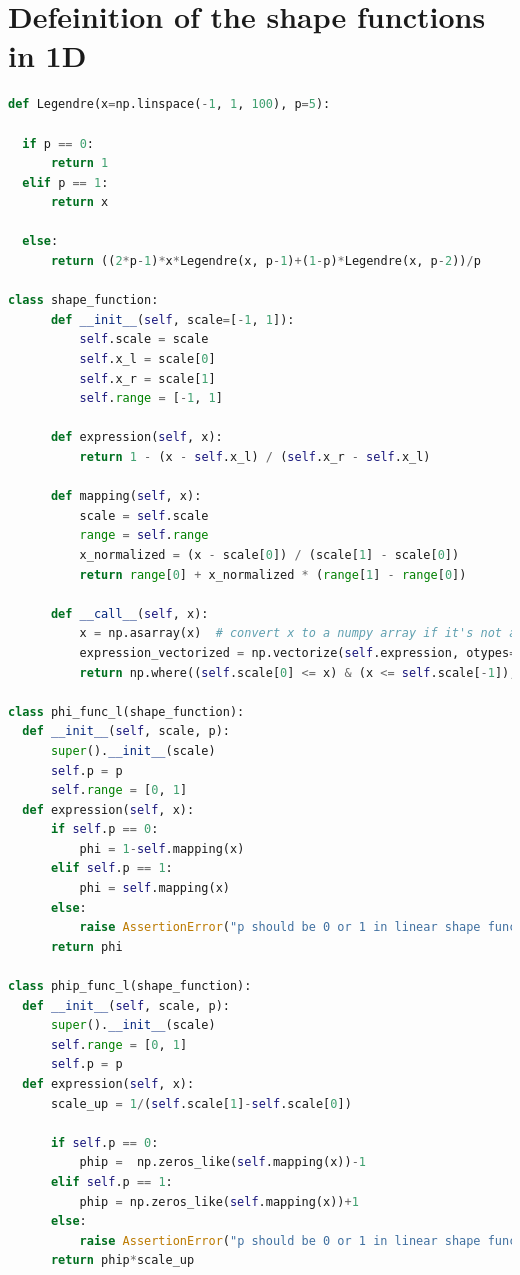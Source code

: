 \documentclass[twoside,twocolumn,10pt]{article}
\begin{document}
\section{Defeinition of the shape functions in 1D}
\label{Apdx:shape_1D}
\begin{lstlisting}[language=Python, caption=Defeinition of the shape functions in 1-D]
def Legendre(x=np.linspace(-1, 1, 100), p=5):

  if p == 0:
      return 1
  elif p == 1:
      return x

  else:
      return ((2*p-1)*x*Legendre(x, p-1)+(1-p)*Legendre(x, p-2))/p

class shape_function:
      def __init__(self, scale=[-1, 1]):
          self.scale = scale
          self.x_l = scale[0]
          self.x_r = scale[1]
          self.range = [-1, 1]
          
      def expression(self, x):
          return 1 - (x - self.x_l) / (self.x_r - self.x_l)
      
      def mapping(self, x):
          scale = self.scale
          range = self.range
          x_normalized = (x - scale[0]) / (scale[1] - scale[0])
          return range[0] + x_normalized * (range[1] - range[0])
  
      def __call__(self, x):
          x = np.asarray(x)  # convert x to a numpy array if it's not already
          expression_vectorized = np.vectorize(self.expression, otypes=['d'])
          return np.where((self.scale[0] <= x) & (x <= self.scale[-1]), expression_vectorized(x), 0)
      
class phi_func_l(shape_function):
  def __init__(self, scale, p):
      super().__init__(scale)
      self.p = p
      self.range = [0, 1]
  def expression(self, x):
      if self.p == 0:
          phi = 1-self.mapping(x)
      elif self.p == 1:
          phi = self.mapping(x) 
      else:
          raise AssertionError("p should be 0 or 1 in linear shape function, not{}".format(self.p))
      return phi
      
class phip_func_l(shape_function):
  def __init__(self, scale, p):
      super().__init__(scale)
      self.range = [0, 1]
      self.p = p
  def expression(self, x):
      scale_up = 1/(self.scale[1]-self.scale[0]) 
      
      if self.p == 0:
          phip =  np.zeros_like(self.mapping(x))-1
      elif self.p == 1:
          phip = np.zeros_like(self.mapping(x))+1
      else:
          raise AssertionError("p should be 0 or 1 in linear shape function, not{}".format(self.p))
      return phip*scale_up
  

\end{lstlisting}
\end{document}
